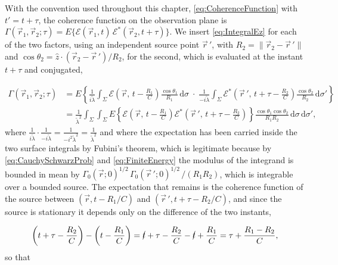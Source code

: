 		With the convention used throughout this chapter, \eqref{eq:CoherenceFunction} with
		$t'=t+\tau$, the coherence function on the observation plane is
		$\Gamma(\vec{r}_{1},\vec{r}_{2};\tau)=E\{\mathcal{E}(\vec{r}_{1},t)\,\mathcal{E}^{*}(\vec{r}_{2},t+\tau)\}$.
		We insert \eqref{eq:IntegralEz} for each of the two factors, using an independent source
		point $\vec{r}\,'$, with $R_{2}=\|\vec{r}_{2}-\vec{r}\,'\|$ and
		$\cos\theta_{2}=\hat{z}\cdot(\vec{r}_{2}-\vec{r}\,')/R_{2}$, for the second, which is
		evaluated at the instant $t+\tau$ and conjugated,

		\begin{align}
			\Gamma(\vec{r}_{1},\vec{r}_{2};\tau) &= E\left\{\frac{1}{i\tilde{\lambda}}\int_{\Sigma}\mathcal{E}\left(\vec{r},\,t-\frac{R_{1}}{C}\right)\frac{\cos\theta_{1}}{R_{1}}\,\mathrm{d}\sigma\;\cdot\;\frac{1}{-i\tilde{\lambda}}\int_{\Sigma}\mathcal{E}^{*}\left(\vec{r}\,',\,t+\tau-\frac{R_{2}}{C}\right)\frac{\cos\theta_{2}}{R_{2}}\,\mathrm{d}\sigma'\right\} \nonumber\\
			&= \frac{1}{\tilde{\lambda}^{2}}\int_{\Sigma}\int_{\Sigma}E\left\{\mathcal{E}\left(\vec{r},\,t-\frac{R_{1}}{C}\right)\mathcal{E}^{*}\left(\vec{r}\,',\,t+\tau-\frac{R_{2}}{C}\right)\right\}\frac{\cos\theta_{1}\cos\theta_{2}}{R_{1}R_{2}}\,\mathrm{d}\sigma\,\mathrm{d}\sigma' ,
		\end{align}
		where $\frac{1}{i\tilde{\lambda}}\cdot\frac{1}{-i\tilde{\lambda}}=\frac{1}{-i^{2}\tilde{\lambda}^{2}}=\frac{1}{\tilde{\lambda}^{2}}$ and where the
		expectation has been carried inside the two surface integrals by Fubini's theorem, which
		is legitimate because by \eqref{eq:CauchySchwarzProb} and \eqref{eq:FiniteEnergy} the
		modulus of the integrand is bounded in mean by
		$\Gamma_{0}(\vec{r};0)^{1/2}\,\Gamma_{0}(\vec{r}\,';0)^{1/2}\,/(R_{1}R_{2})$, which is
		integrable over a bounded source. The expectation that remains is the coherence function
		of the source between $(\vec{r},t-R_{1}/C)$ and $(\vec{r}\,',t+\tau-R_{2}/C)$, and since
		the source is stationary it depends only on the difference of the two instants,

		\begin{equation}
			\left(t+\tau-\frac{R_{2}}{C}\right)-\left(t-\frac{R_{1}}{C}\right) = \cancel{t}+\tau-\frac{R_{2}}{C}-\cancel{t}+\frac{R_{1}}{C} = \tau+\frac{R_{1}-R_{2}}{C},
		\end{equation}
		so that

